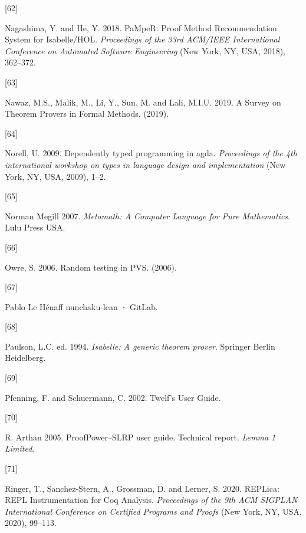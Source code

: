 \documentclass[
]{article}
\newlength{\cslhangindent}
\newlength{\csllabelwidth}
\newlength{\cslentryspacingunit} %
\newenvironment{CSLReferences}[2] %
 {%
  \setlength{\parindent}{0pt}
  \ifodd #1
  \let\oldpar\par
  \def\par{\hangindent=\cslhangindent\oldpar}
  \fi
  \setlength{\parskip}{#2\cslentryspacingunit}
 }%
 {}
\newcommand{\CSLLeftMargin}[1]{\parbox[t]{\csllabelwidth}{#1}}
\newcommand{\CSLRightInline}[1]{\parbox[t]{\linewidth - \csllabelwidth}{#1}\break}
\begin{document}
\begin{CSLReferences}{0}{0}
\leavevmode{}%
\CSLLeftMargin{{[}62{]} }
\CSLRightInline{Nagashima, Y. and He, Y. 2018. {PaMpeR}: {Proof}
{Method} {Recommendation} {System} for {Isabelle}/{HOL}.
\emph{Proceedings of the 33rd {ACM}/{IEEE} {International} {Conference}
on {Automated} {Software} {Engineering}} (New York, NY, USA, 2018),
362--372.}

\leavevmode{}%
\CSLLeftMargin{{[}63{]} }
\CSLRightInline{Nawaz, M.S., Malik, M., Li, Y., Sun, M. and Lali, M.I.U.
2019. A {Survey} on {Theorem} {Provers} in {Formal} {Methods}. (2019).}

\leavevmode{}%
\CSLLeftMargin{{[}64{]} }
\CSLRightInline{Norell, U. 2009. Dependently typed programming in agda.
\emph{Proceedings of the 4th international workshop on types in language
design and implementation} (New York, NY, USA, 2009), 1--2.}

\leavevmode{}%
\CSLLeftMargin{{[}65{]} }
\CSLRightInline{Norman Megill 2007. \emph{{Metamath: A Computer Language
for Pure Mathematics}}. {Lulu Press USA}.}

\leavevmode{}%
\CSLLeftMargin{{[}66{]} }
\CSLRightInline{Owre, S. 2006. Random testing in PVS. (2006).}

\leavevmode{}%
\CSLLeftMargin{{[}67{]} }
\CSLRightInline{Pablo Le Hénaff {nunchaku-lean · GitLab}.}

\leavevmode{}%
\CSLLeftMargin{{[}68{]} }
\CSLRightInline{Paulson, L.C. ed. 1994. \emph{Isabelle: A generic
theorem prover}. Springer Berlin Heidelberg.}

\leavevmode{}%
\CSLLeftMargin{{[}69{]} }
\CSLRightInline{Pfenning, F. and Schuermann, C. 2002. {Twelf's User
Guide}.}

\leavevmode{}%
\CSLLeftMargin{{[}70{]} }
\CSLRightInline{R. Arthan 2005. {ProofPower--SLRP user guide. Technical
report}. \emph{{Lemma 1 Limited}}.}

\leavevmode{}%
\CSLLeftMargin{{[}71{]} }
\CSLRightInline{Ringer, T., Sanchez-Stern, A., Grossman, D. and Lerner,
S. 2020. {REPLica}: {REPL} {Instrumentation} for {Coq} {Analysis}.
\emph{Proceedings of the 9th {ACM} {SIGPLAN} {International}
{Conference} on {Certified} {Programs} and {Proofs}} (New York, NY, USA,
2020), 99--113.}


\end{CSLReferences}
\end{document}

